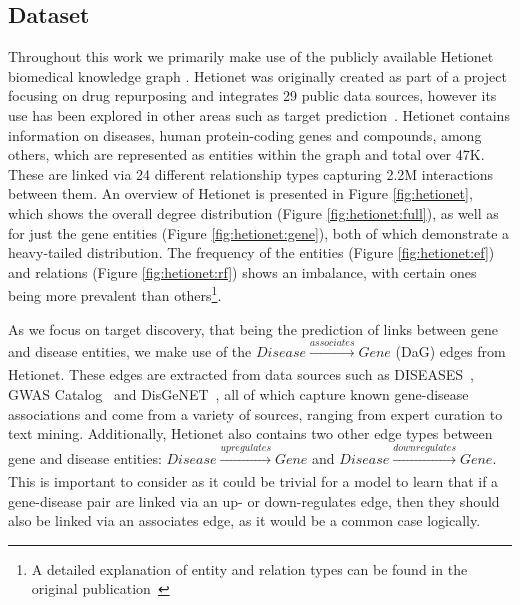 \subsection{Dataset}\label{ssec:dataset}

Throughout this work we primarily make use of the publicly available Hetionet biomedical knowledge graph \cite{himmelstein2017systematic}. Hetionet was originally created as part of a project focusing on drug repurposing and integrates 29 public data sources, however its use has been explored in other areas such as target prediction~\cite{bonner2021understanding}. Hetionet contains information on diseases, human protein-coding genes and compounds, among others, which are represented as entities within the graph and total over 47K. These are linked via 24 different relationship types capturing 2.2M interactions between them. An overview of Hetionet is presented in Figure \ref{fig:hetionet}, which shows the overall degree distribution (Figure \ref{fig:hetionet:full}), as well as for just the gene entities (Figure \ref{fig:hetionet:gene}), both of which demonstrate a heavy-tailed distribution. The frequency of the entities (Figure \ref{fig:hetionet:ef}) and relations (Figure \ref{fig:hetionet:rf}) shows an imbalance, with certain ones being more prevalent than others\footnote{A detailed explanation of entity and relation types can be found in the original publication~\cite{himmelstein2017systematic}}.

As we focus on target discovery, that being the prediction of links between gene and disease entities, we make use of the \(\mathit{Disease} \xrightarrow[]{\textit{associates}} \mathit{Gene}\) (DaG) edges from Hetionet. These edges are extracted from data sources such as DISEASES~\cite{pletscher2015diseases}, GWAS Catalog~\cite{buniello2019nhgri} and DisGeNET~\cite{pinero2016disgenet}, all of which capture known gene-disease associations and come from a variety of sources, ranging from expert curation to text mining. Additionally, Hetionet also contains two other edge types between gene and disease entities: \(\mathit{Disease} \xrightarrow[]{\textit{upregulates}} \mathit{Gene}\) and \(\mathit{Disease} \xrightarrow[]{\textit{downregulates}} \mathit{Gene}\). This is important to consider as it could be trivial for a model to learn that if a gene-disease pair are linked via an up- or down-regulates edge, then they should also be linked via an associates edge, as it would be a common case logically.

